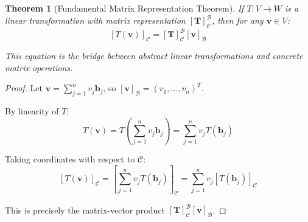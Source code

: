 \documentclass[12pt]{article}
\numberwithin{equation}{section}
\newcommand{\vect}[1]{\boldsymbol{#1}}   %
\newcommand{\mat}[1]{\mathbf{#1}}        %
\theoremstyle{plain}
\newtheorem{theorem}{Theorem}[section]
\theoremstyle{definition}
\theoremstyle{remark}
\begin{document}
\begin{theorem}[Fundamental Matrix Representation Theorem]
If $T: V \to W$ is a linear transformation with matrix representation $[\mat{T}]_{\mathcal{C}}^{\mathcal{B}}$, then for any $\vect{v} \in V$:
$$[T(\vect{v})]_{\mathcal{C}} = [\mat{T}]_{\mathcal{C}}^{\mathcal{B}} [\vect{v}]_{\mathcal{B}}$$

This equation is the bridge between abstract linear transformations and concrete matrix operations.
\end{theorem}

\begin{proof}
Let $\vect{v} = \sum_{j=1}^n v_j \vect{b}_j$, so $[\vect{v}]_{\mathcal{B}} = (v_1, \ldots, v_n)^T$.

By linearity of $T$:
$$T(\vect{v}) = T\left(\sum_{j=1}^n v_j \vect{b}_j\right) = \sum_{j=1}^n v_j T(\vect{b}_j)$$

Taking coordinates with respect to $\mathcal{C}$:
$$[T(\vect{v})]_{\mathcal{C}} = \left[\sum_{j=1}^n v_j T(\vect{b}_j)\right]_{\mathcal{C}} = \sum_{j=1}^n v_j [T(\vect{b}_j)]_{\mathcal{C}}$$

This is precisely the matrix-vector product $[\mat{T}]_{\mathcal{C}}^{\mathcal{B}} [\vect{v}]_{\mathcal{B}}$.
\end{proof}
\end{document}

